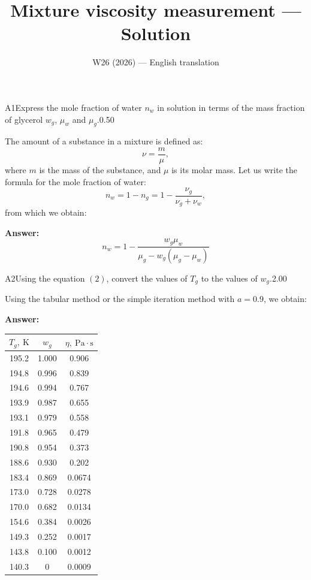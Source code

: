 \documentclass[11pt,a4paper]{article}
\title{\textbf{Mixture viscosity measurement --- Solution}}
\author{\normalsize W26 (2026) — English translation}
\date{}
\begin{document}
\maketitle\vspace{-0.5em}

\begin{solcard}{A1}{Express the mole fraction of water $n_w$ in solution in terms of the mass fraction of glycerol $w_g$, $\mu_w$ and $\mu_g$.}{0.50}

The amount of a substance in a mixture is defined as: \[\nu=\dfrac{m}{\mu},\] where $m$ is the mass of the substance, and $\mu$ is its molar mass. Let us write the formula for the mole fraction of water: \[n_w=1-n_g=1-\dfrac{\nu_g}{\nu_g+\nu_w},\] from which we obtain:

\par\smallskip\noindent\textbf{Answer:} \[n_w=1-\frac{w_g\mu_w}{\mu_g-w_g(\mu_g-\mu_w)}\]
\end{solcard}

\begin{solcard}{A2}{Using the equation $(2)$, convert the values of $T_g$ to the values of $w_g$.}{2.00}

Using the tabular method or the simple iteration method with $a=0.9$, we obtain:

\par\smallskip\noindent\textbf{Answer:} 
\begin{table}[H]
\centering
\begin{tabular}{|c|c|c|}
\hline
$T_g,~\mathrm{K}$ & $w_g$ & $\eta,~\mathrm{Pa}\cdot\mathrm{s}$ \\
\hline
195.2 & 1.000 & 0.906 \\
194.8 & 0.996 & 0.839 \\
194.6 & 0.994 & 0.767 \\
193.9 & 0.987 & 0.655 \\
193.1 & 0.979 & 0.558 \\
191.8 & 0.965 & 0.479 \\
190.8 & 0.954 & 0.373 \\
188.6 & 0.930 & 0.202 \\
183.4 & 0.869 & 0.0674 \\
173.0 & 0.728 & 0.0278 \\
170.0 & 0.682 & 0.0134 \\
154.6 & 0.384 & 0.0026 \\
149.3 & 0.252 & 0.0017 \\
143.8 & 0.100 & 0.0012 \\
140.3 & 0 & 0.0009 \\
\hline
\end{tabular}
\end{table}
\end{solcard}
\end{document}
